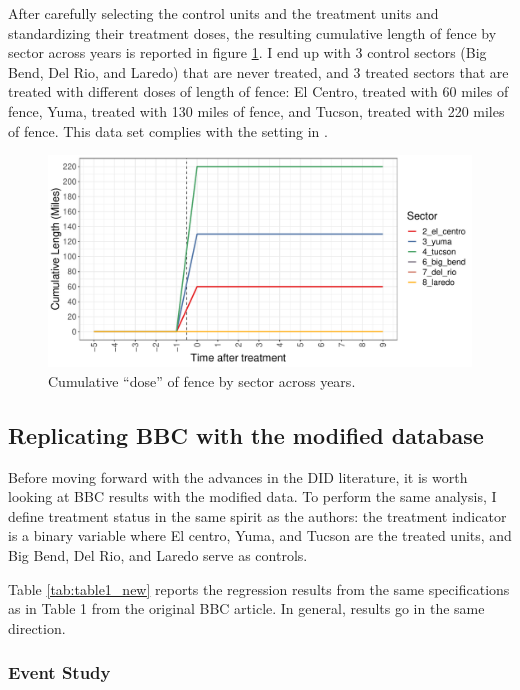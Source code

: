 \documentclass[titlepage]{article}
\theoremstyle{plain}
\theoremstyle{plain}
\begin{document}
After carefully selecting the control units and the treatment units and standardizing their treatment doses, the resulting cumulative length of fence by sector across years is reported in figure \ref{fig:plot_dose}. I end up with 3 control sectors (Big Bend, Del Rio, and Laredo) that are never treated, and 3 treated sectors that are treated with different doses of length of fence: El Centro, treated with 60 miles of fence, Yuma, treated with 130 miles of fence, and Tucson, treated with 220 miles of fence. This data set complies with the setting in \cite{callaway2021differenceindifferences}.

\begin{figure}[H]
	\centering
	\caption{Cumulative \enquote{dose} of fence by sector across years.} 
	\label{fig:plot_dose} 
	\includegraphics[width=\textwidth]{_images/plot_dose.pdf}
\end{figure}

\subsection*{Replicating BBC with the modified database}

Before moving forward with the advances in the DID literature, it is worth looking at BBC results with the modified data. To perform the same analysis, I define treatment status in the same spirit as the authors: the treatment indicator is a binary variable where El centro, Yuma, and Tucson are the treated units, and Big Bend, Del Rio, and Laredo serve as controls.

Table \ref{tab:table1_new} reports the regression results from the same specifications as in Table 1 from the original BBC article. In general, results go in the same direction.



\subsubsection*{Event Study}
\end{document}
